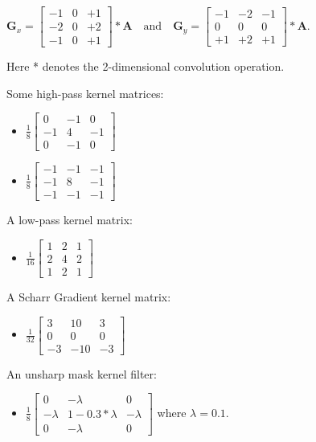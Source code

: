 \documentclass[12pt]{amsart}
\theoremstyle{definition}
\theoremstyle{remark}
\numberwithin{thm}{section}
\begin{document}
$\mathbf{G}_x = \begin{bmatrix} 
 -1 & 0 & +1  \\
-2 & 0 & +2 \\
-1 & 0 & +1 
\end{bmatrix} * \mathbf{A}
\quad
\mbox{and}
\quad   
\mathbf{G}_y = \begin{bmatrix} 
-1 & -2 & -1 \\
 0 & 0 & 0 \\
+1 & +2 & +1
\end{bmatrix} * \mathbf{A}$.

Here * denotes the 2-dimensional convolution operation.

Some high-pass kernel matrices:
\begin{itemize}
\item
$
\frac{1}{8}
\begin{bmatrix}
0 & -1 & 0\\
-1 & 4 & -1\\
0 & -1 & 0
\end{bmatrix}$
\item
$
\frac{1}{8}
\begin{bmatrix}
-1 & -1 & -1\\
-1 & 8 & -1\\
-1 & -1 & -1
\end{bmatrix}$
\end{itemize}

A low-pass kernel matrix:
\begin{itemize}
\item
$
\frac{1}{16}
\begin{bmatrix}
1 & 2 & 1\\
2 & 4 & 2\\
1 & 2 & 1
\end{bmatrix}$
\end{itemize}

A Scharr Gradient kernel matrix:
\begin{itemize}
\item
$
\frac{1}{32}
\begin{bmatrix}
3 & 10 & 3\\
0 & 0 & 0\\
-3 & -10 & -3
\end{bmatrix}$
\end{itemize}

An unsharp mask kernel filter:
\begin{itemize}
\item
$
\frac{1}{8}
\begin{bmatrix}
0 &-\lambda &0\\
-\lambda &1-0.3*\lambda &-\lambda\\
0 &-\lambda &0
\end{bmatrix}
$
where $\lambda=0.1$.
\end{itemize}
\end{document}
